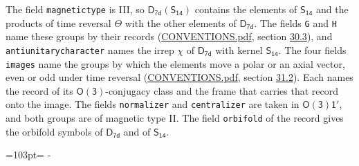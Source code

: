\documentclass[10pt,a4paper]{article}
\newcommand{\needspace}[1]{\par\penalty-100\begingroup\dimen0=#1\relax\dimen2=\pagegoal
  \advance\dimen2-\pagetotal\ifdim\dimen0>\dimen2\relax\ifdim\dimen2>0pt\vfil\break\fi\fi
  \endgroup}
\numberwithin{equation}{section}
\newcommand{\grp}[1]{\mathsf{#1}}
\begin{document}
The field \texttt{magnetictype} is III, so $\grp{D_{7d}}(\grp{S_{14}})$ contains the elements of $\grp{S_{14}}$ and the products of time reversal $\varTheta$ with the other elements of $\grp{D_{7d}}$. The fields \texttt{G} and \texttt{H} name these groups by their records (\href{../../CONVENTIONS.pdf}{CONVENTIONS.pdf}, section \href{../../CONVENTIONS.pdf\#conv.30.3}{30.3}), and \texttt{antiunitarycharacter} names the irrep $\chi$ of $\grp{D_{7d}}$ with kernel $\grp{S_{14}}$. The four fields \texttt{images} name the groups by which the elements move a polar or an axial vector, even or odd under time reversal (\href{../../CONVENTIONS.pdf}{CONVENTIONS.pdf}, section \href{../../CONVENTIONS.pdf\#conv.31.2}{31.2}). Each names the record of its $\grp{O(3)}$-conjugacy class and the frame that carries that record onto the image. The fields \texttt{normalizer} and \texttt{centralizer} are taken in $\grp{O(3)1'}$, and both groups are of magnetic type II. The field \texttt{orbifold} of the record gives the orbifold symbols of $\grp{D_{7d}}$ and of $\grp{S_{14}}$.
\needspace{103pt}
\end{document}

